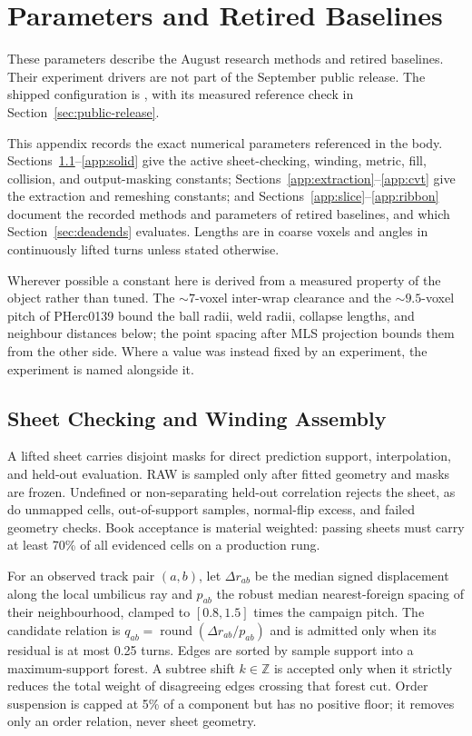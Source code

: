 \section{Parameters and Retired Baselines}
\label{app:terms}

These parameters describe the August research methods and retired baselines.
Their experiment drivers are not part of the September public release.
The shipped configuration is , with its measured
reference check in Section~\ref{sec:public-release}.

This appendix records the exact numerical parameters referenced in the body. Sections~\ref{app:assembly}--\ref{app:solid} give the active sheet-checking, winding, metric, fill, collision, and output-masking constants; Sections~\ref{app:extraction}--\ref{app:cvt} give the extraction and remeshing constants; and Sections~\ref{app:slice}--\ref{app:ribbon} document the recorded methods and parameters of retired baselines, and which Section~\ref{sec:deadends} evaluates. Lengths are in coarse voxels and angles in continuously lifted turns unless stated otherwise.

Wherever possible a constant here is derived from a measured property of the object rather than tuned. The ${\sim}7$-voxel inter-wrap clearance and the ${\sim}9.5$-voxel pitch of PHerc0139 bound the ball radii, weld radii, collapse lengths, and neighbour distances below; the point spacing after MLS projection bounds them from the other side. Where a value was instead fixed by an experiment, the experiment is named alongside it.

\subsection{Sheet Checking and Winding Assembly}
\label{app:assembly}

A lifted sheet carries disjoint masks for direct prediction support, interpolation, and held-out evaluation. RAW is sampled only after fitted geometry and masks are frozen. Undefined or non-separating held-out correlation rejects the sheet, as do unmapped cells, out-of-support samples, normal-flip excess, and failed geometry checks. Book acceptance is material weighted: passing sheets must carry at least 70\% of all evidenced cells on a production rung.

For an observed track pair $(a,b)$, let $\Delta r_{ab}$ be the median signed displacement along the local umbilicus ray and $p_{ab}$ the robust median nearest-foreign spacing of their neighbourhood, clamped to $[0.8,1.5]$ times the campaign pitch. The candidate relation is $q_{ab}=\operatorname{round}(\Delta r_{ab}/p_{ab})$ and is admitted only when its residual is at most 0.25 turns. Edges are sorted by sample support into a maximum-support forest. A subtree shift $k\in\mathbb Z$ is accepted only when it strictly reduces the total weight of disagreeing edges crossing that forest cut. Order suspension is capped at 5\% of a component but has no positive floor; it removes only an order relation, never sheet geometry.

